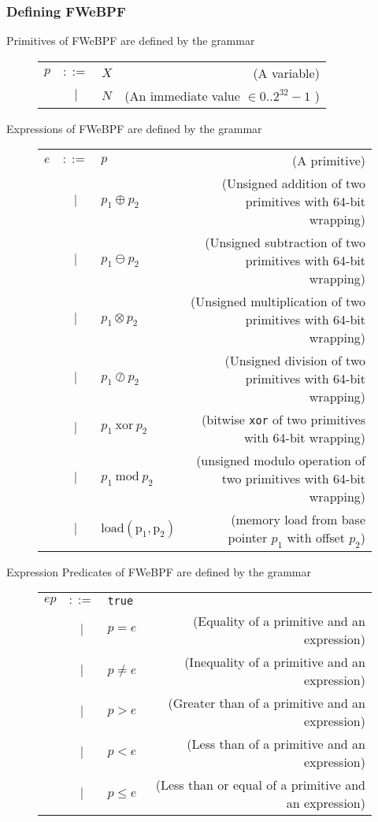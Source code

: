 \subsubsection{Defining FWeBPF}


Primitives of FWeBPF are defined by the grammar
\begin{figure}[H]
  \centering
  \begin{tabular}{lclr}
    $p$ & $::=$ & $X$ & (A variable) \\
        & $|$ & $N$ & (An immediate value $\in 0..2^{32}-1$ ) \\
\end{tabular}    
\end{figure}


Expressions of FWeBPF are defined by the grammar
\begin{figure}[H]
  \centering
  \begin{tabular}{lclr}
    $e$ & $::=$ & $p$ & (A primitive) \\
        & $|$ & $p_1 \oplus  p_2$ & (Unsigned addition of two primitives with 64-bit wrapping) \\
      & $|$ & $p_1 \ominus  p_2$ & (Unsigned subtraction of two primitives with 64-bit wrapping) \\        
      & $|$ & $p_1 \otimes p_2$ & (Unsigned multiplication of two primitives with 64-bit wrapping) \\    
      & $|$ & $p_1 \oslash p_2$ & (Unsigned division of two primitives with 64-bit wrapping) \\
        & $|$ & $p_1 ~ \mathrm{xor} ~ p_2$ & (bitwise \texttt{xor} of two primitives with 64-bit wrapping) \\
        & $|$ & $p_1 ~ \mathrm{mod} ~ p_2$ & (unsigned modulo operation of two primitives with 64-bit wrapping) \\    
      & $|$ & $\mathrm{load(p_1,p_2)}$ & (memory load from base pointer $p_1$ with offset $p_2$) \\            
\end{tabular}    
\end{figure}

Expression Predicates of FWeBPF are defined by the grammar
\begin{figure}[H]
  \centering
  \begin{tabular}{lclr}
    $ep$ & $::=$ & \texttt{true} & \\
         & $|$ & $p = e$ & (Equality of a primitive and an expression) \\    
         & $|$ & $p \neq e$ & (Inequality of a primitive and an expression) \\
         & $|$ &  $p > e$ & (Greater than of a primitive and an expression) \\            
         & $|$ &  $p < e$ & (Less than of a primitive and an expression) \\        
         & $|$ &  $p \leq e$ & (Less than or equal of a primitive and an expression) \\
\end{tabular}    
\end{figure}


